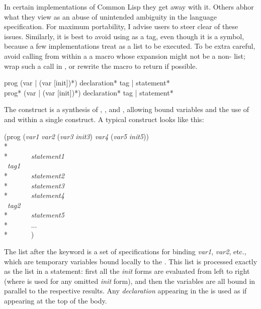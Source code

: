 \begin{defspec}
\begin{new}
In certain implementations of Common Lisp they get away with it.
Others abhor what they view as an abuse of unintended ambiguity
in the language specification.  For maximum portability, I advise
users to steer clear of these issues.  Similarly, it is best
to avoid using  as a tag, even though it is a symbol, because
a few implementations treat  as a list to be executed.
To be extra careful, avoid calling from within a 
a macro whose expansion might not be a non- list; wrap such a 
call in , or rewrite the macro to return 
if possible.
\end{new}
\end{defspec}

\begin{defmac}
prog ({var | (var [init])}*) {declaration}* {tag | statement}* \\
prog* ({var | (var [init])}*) {declaration}* {tag | statement}*

The  construct is a synthesis of , ,
and , allowing bound variables and the use of  and 
within a single construct.  A typical  construct looks like this:
\begin{lisp}
(prog (\emph{var1} \emph{var2} (\emph{var3} \emph{init3}) \emph{var4} (\emph{var5} \emph{init5})) \\*
~~~~~~ \\*
~~~~~~\emph{statement1} \\
~\emph{tag1} \\*
~~~~~~\emph{statement2} \\*
~~~~~~\emph{statement3} \\*
~~~~~~\emph{statement4} \\
~\emph{tag2} \\*
~~~~~~\emph{statement5} \\*
~~~~~~... \\*
~~~~~~)
\end{lisp}
The list after the keyword  is a set of specifications for binding
\emph{var1}, \emph{var2}, etc.,
which are temporary variables bound locally to the .
This list is processed exactly as the list in a  statement:
first all the \emph{init} forms are evaluated from left to right
(where {\false} is used for
any omitted \emph{init} form), and then the variables are all bound in
parallel to the respective results.
Any \emph{declaration} appearing in the  is used as if appearing
at the top of the  body.


\end{defmac}
